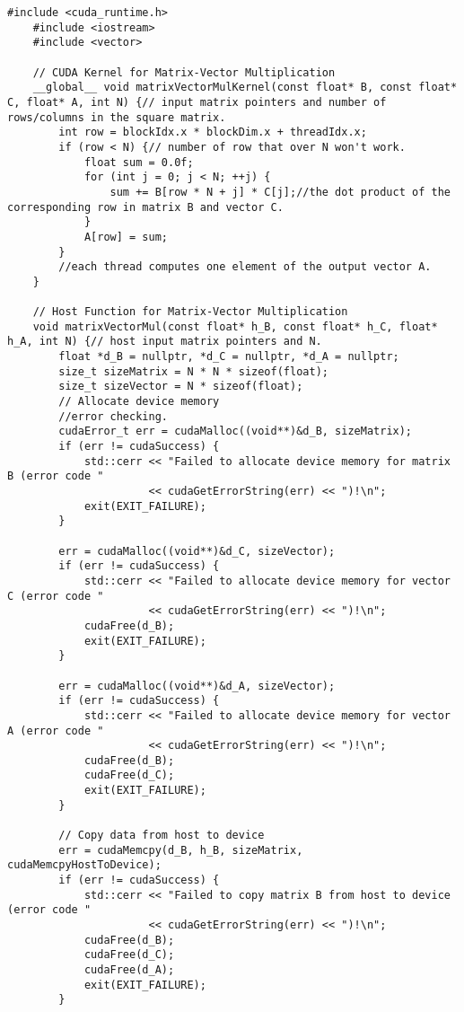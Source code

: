 \documentclass{article}
\begin{document}
\begin{lstlisting}[breaklines=true]
    #include <cuda_runtime.h>
    #include <iostream>
    #include <vector>
    
    // CUDA Kernel for Matrix-Vector Multiplication
    __global__ void matrixVectorMulKernel(const float* B, const float* C, float* A, int N) {// input matrix pointers and number of rows/columns in the square matrix.
        int row = blockIdx.x * blockDim.x + threadIdx.x;
        if (row < N) {// number of row that over N won't work.
            float sum = 0.0f;
            for (int j = 0; j < N; ++j) {
                sum += B[row * N + j] * C[j];//the dot product of the corresponding row in matrix B and vector C.
            }
            A[row] = sum;
        }
        //each thread computes one element of the output vector A.
    }
    
    // Host Function for Matrix-Vector Multiplication
    void matrixVectorMul(const float* h_B, const float* h_C, float* h_A, int N) {// host input matrix pointers and N.
        float *d_B = nullptr, *d_C = nullptr, *d_A = nullptr;
        size_t sizeMatrix = N * N * sizeof(float);
        size_t sizeVector = N * sizeof(float);
        // Allocate device memory
        //error checking.
        cudaError_t err = cudaMalloc((void**)&d_B, sizeMatrix);
        if (err != cudaSuccess) {
            std::cerr << "Failed to allocate device memory for matrix B (error code " 
                      << cudaGetErrorString(err) << ")!\n";
            exit(EXIT_FAILURE);
        }
    
        err = cudaMalloc((void**)&d_C, sizeVector);
        if (err != cudaSuccess) {
            std::cerr << "Failed to allocate device memory for vector C (error code " 
                      << cudaGetErrorString(err) << ")!\n";
            cudaFree(d_B);
            exit(EXIT_FAILURE);
        }
    
        err = cudaMalloc((void**)&d_A, sizeVector);
        if (err != cudaSuccess) {
            std::cerr << "Failed to allocate device memory for vector A (error code " 
                      << cudaGetErrorString(err) << ")!\n";
            cudaFree(d_B);
            cudaFree(d_C);
            exit(EXIT_FAILURE);
        }
    
        // Copy data from host to device
        err = cudaMemcpy(d_B, h_B, sizeMatrix, cudaMemcpyHostToDevice);
        if (err != cudaSuccess) {
            std::cerr << "Failed to copy matrix B from host to device (error code " 
                      << cudaGetErrorString(err) << ")!\n";
            cudaFree(d_B);
            cudaFree(d_C);
            cudaFree(d_A);
            exit(EXIT_FAILURE);
        }
    

\end{lstlisting}
\end{document}
